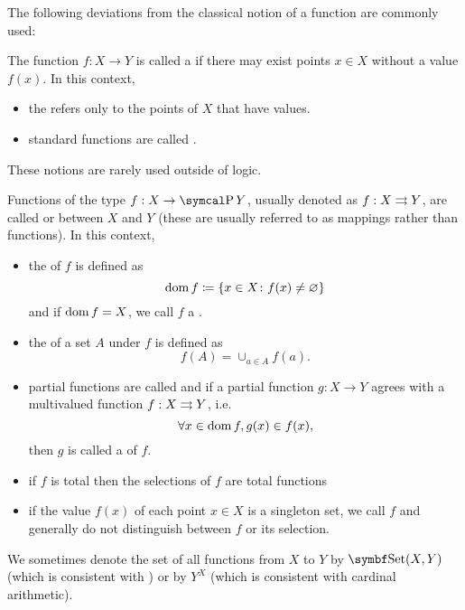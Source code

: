 \begin{definition}
  The following deviations from the classical notion of a function are commonly used:
  \begin{itemize}
     The function \( f: X \to Y \) is called a if there may exist points \( x \in X \) without a value \( f(x) \). In this context,
    \begin{itemize}
      \item the  refers only to the points of \( X \) that have values.
      \item standard functions are called .
    \end{itemize}

    These notions are rarely used outside of logic.

     Functions of the type \( f: X \to \Power Y \), usually denoted as \( f: X \rightrightarrows Y \), are called   or  between \( X \) and \( Y \) (these are usually referred to as mappings rather than functions). In this context,
    \begin{itemize}
      \item the  of \( f \) is defined as
      \begin{equation*}
        \operatorname{dom} f \coloneqq \{ x \in X \colon f(x) \neq \varnothing \}
      \end{equation*}
      and if \( \operatorname{dom} f = X \), we call \( f \) a .

      \item the  of a set \( A \) under \( f \) is defined as
      \begin{equation*}
        f(A) = \cup_{a \in A} f(a).
      \end{equation*}

      \item partial functions are called  and if a partial function \( g: X \to Y \) agrees with a multivalued function \( f: X \rightrightarrows Y \), i.e.
      \begin{equation*}
        \forall x \in \operatorname{dom} f, g(x) \in f(x),
      \end{equation*}
      then \( g \) is called a  of \( f \).

      \item if \( f \) is total then the selections of \( f \) are total functions

      \item if the value \( f(x) \) of each point \( x \in X \) is a singleton set, we call \( f \)  and generally do not distinguish between \( f \) or its selection.
    \end{itemize}
  \end{itemize}

  We sometimes denote the set of all functions from \( X \) to \( Y \) by \( \Cat{Set}(X, Y) \) (which is consistent with ) or by \( Y^X \) (which is consistent with cardinal arithmetic).
\end{definition}

